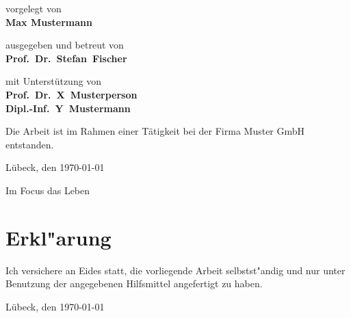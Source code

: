\begin{titlepage}
{	\titlepageskip
	vorgelegt von\\
	\textbf{Max Mustermann}

	\titlepageskip
	ausgegeben und betreut von\\
	\textbf{Prof.~Dr.~Stefan~Fischer}

	\titlepageskip
	{
		mit Unterstützung von\\
		\textbf{Prof.~Dr.~X~Musterperson}\\
		\textbf{Dipl.-Inf.~Y~Mustermann}\\
	}

	\titlepageskip
	{
		Die Arbeit ist im Rahmen einer Tätigkeit bei der Firma Muster GmbH entstanden.
	}

	\vfill
	{
		Lübeck, den \today
	}

	{
		\titlepageskip
		Im Focus das Leben
	}
}
\end{titlepage}
\restoregeometry

\cleardoublepage

\newpage
\chapter*{Erkl"arung}

Ich versichere an Eides statt, die vorliegende Arbeit selbstst"andig und nur unter Benutzung
der angegebenen Hilfsmittel angefertigt zu haben.

\vspace*{3cm}
Lübeck, den \today

\thispagestyle{empty}
\cleardoublepage


